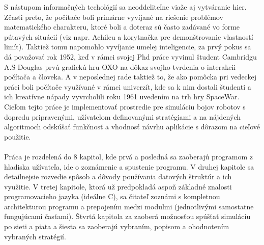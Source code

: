 \indent S nástupom informačných techológií sa neoddeliteľne viaže aj vytváranie hier. Zčasti preto, že počítače boli primárne vyvíjané na riešenie problémov matematického charakteru, ktoré boli a doteraz sú často zadávané vo forme pútavých situácií (viz napr. Achileu a korytnačka pre demonštrovanie vlastností limít). Taktiež tomu napomohlo vyvíjanie umelej inteligencie, za prvý pokus sa dá považovať rok 1952, keď v rámci svojej Phd práce vyvinul študent Cambridgu A.S Douglas prvú grafickú hru OXO na dôkaz svojho tvrdenia o interakcii počítača a človeka. A v neposlednej rade taktiež to, že ako pomôcka pri vedeckej práci boli počítače využívané v rámci univerzít, kde sa k nim dostali študenti a ich kreatívne nápady vyvrcholili roku 1961 uvedením na trh hry SpaceWar.
\indent
\indent Cieľom tejto práce je implementovať prostredie pre simuláciu bojov robotov s dopredu pripravenými, užívateľom definovanými stratégiami a na nájdených algoritmoch odskúšať funkčnosť a vhodnosť návrhu aplikácie s dôrazom na cieľové použitie. \\\\
\indent Práca je rozdelená do 8 kapitol, kde prvá a posledná sa zaoberajú programom z hladiska užívateľa, ide o zoznámenie a spustenie programu. V druhej kapitole sa detailnejsie rozvedie spôsob a dôvody používania datových štruktúr a ich využitie. V tretej kapitole, ktorá už predpokladá aspoň základné znalosti programovacieho jazyka (ideálne C), sa čitateľ zoznámi s kompletnou architekturou programu a prepojením medzi modulmi (jednotlivými samostatne fungujúcami časťami). Štvrtá kapitola za zaoberá možnosťou spúšťať simuláciu po sieti a piata a šiesta sa zaoberajú vybraním, popisom a ohodnotením vybraných stratégií.
